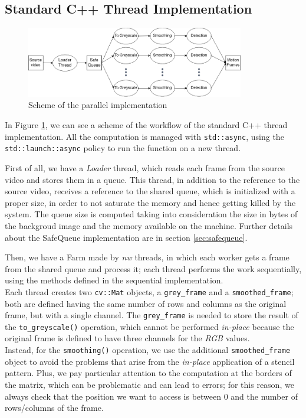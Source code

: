 \subsection{Standard C++ Thread Implementation}

\begin{figure}[b]
    \includegraphics[width=0.85\textwidth]{img/par_code.png}
    \centering
    \caption{Scheme of the parallel implementation}
    \label{fig:par_code}
\end{figure}

In Figure \ref{fig:par_code}, we can see a scheme of the workflow of the standard C++ thread implementation.
All the computation is managed with \texttt{std::async}, using the \texttt{std::launch::async} policy to run the function on a new thread.

First of all, we have a \emph{Loader} thread, which reads each frame from the source video and stores them in a queue. This thread, in addition to the reference to the source video, receives a reference to the shared queue, which is initialized with a proper size, in order to not saturate the memory and hence getting killed by the system. The queue size is computed taking into consideration the size in bytes of the backgroud image and the memory available on the machine. Further details about the SafeQueue implementation are in section \ref{sec:safequeue}.

Then, we have a Farm made by \emph{nw} threads, in which each worker gets a frame from the shared queue and process it; each thread performs the work sequentially, using the methods defined in the sequential implementation.\\
Each thread creates two \texttt{cv::Mat} objects, a \texttt{grey\_frame} and a \texttt{smoothed\_frame}; both are defined having the same number of rows and columns as the original frame, but with a single channel.
The \texttt{grey\_frame} is needed to store the result of the \texttt{to\_greyscale()} operation, which cannot be performed \emph{in-place} because the original frame is defined to have three channels for the \emph{RGB} values.\\
Instead, for the \texttt{smoothing()} operation, we use the additional \texttt{smoothed\_frame} object to avoid the problems that arise from the \emph{in-place} application of a stencil pattern. Plus, we pay particular attention to the computation at the borders of the matrix, which can be problematic and can lead to errors; for this reason, we always check that the position we want to access is between 0 and the number of rows/columns of the frame.

